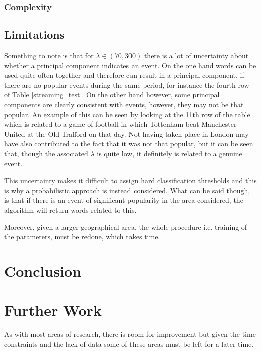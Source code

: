 \documentclass[11pt,a4paper]{article}
\begin{document}
\subsubsection{Complexity}


\subsection{Limitations}

Something to note is that for $\lambda \in (70, 300) $ there is a lot of uncertainty about whether a principal component indicates an event. On the one hand words can be used quite often together and therefore can result in a principal component, if there are no popular events during the same period, for instance the fourth row of Table \ref{streaming_test}. On the other hand however, some principal components are clearly consistent with events, however, they may not be that popular. An example of this can be seen by looking at the 11th row of the table which is related to a game of football in which Tottenham beat Manchester United at the Old Trafford on that day. Not having taken place in London may have also contributed to the fact that it was not that popular, but it can be seen that, though the associated $\lambda$ is quite low, it definitely is related to a genuine event. 

This uncertainty makes it difficult to assign hard classification thresholds and this is why a probabilistic approach is instead considered. What can be said though, is that if there is an event of significant popularity in the area considered, the algorithm will return words related to this.

Moreover, given a larger geographical area, the whole procedure i.e. training of the parameters, must be redone, which takes time. 


\clearpage
\section{Conclusion}
\section{Further Work}

As with most areas of research, there is room for improvement but given the time constraints and the lack of data some of these areas must be left for a later time. 
\end{document}
